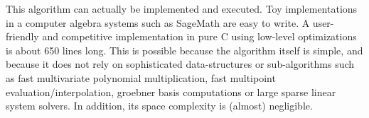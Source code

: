\documentclass[a4paper]{article}
\begin{document}
This algorithm can actually be implemented and executed. Toy implementations in
a computer algebra systems such as \textsf{SageMath} are easy to write. A
user-friendly and competitive implementation in pure C using low-level
optimizations is about 650 lines long. This is possible because the algorithm
itself is simple, and because it does not rely on sophisticated data-structures
or sub-algorithms such as fast multivariate polynomial multiplication, fast
multipoint evaluation/interpolation, groebner basis computations or large sparse
linear system solvers. In addition, its space complexity is (almost) negligible.



\end{document}
